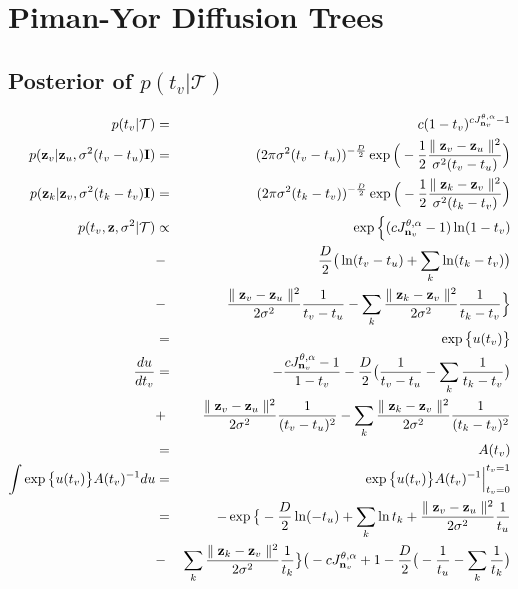 \documentclass{article}
\begin{document}
\section{Piman-Yor Diffusion Trees}
\subsection{Posterior of $p(t_v | \mathcal{T})$}	
	
	\begin{eqnarray}
	p(t_v | \mathcal{T}) &=& c(1-t_v)^{cJ^{\theta,\alpha}_{\bold{n}_v} - 1} \\
	p(\bold{z}_v | \bold{z}_u, \sigma^2(t_v - t_u)\bold{I}) &=& (2 \pi \sigma^2(t_v - t_u))^{-\frac{D}{2}} \exp \Big(-\frac{1}{2}\frac{\parallel \bold{z}_v - \bold{z}_u \parallel^2}{\sigma^2 (t_v - t_u)} \Big)\\
	p(\bold{z}_k | \bold{z}_v, \sigma^2(t_k - t_v)\bold{I}) &=& (2 \pi \sigma^2(t_k - t_v))^{-\frac{D}{2}} \exp \Big(-\frac{1}{2}\frac{\parallel \bold{z}_k - \bold{z}_v \parallel^2}{\sigma^2 (t_k - t_v)} \Big)\\
	p(t_v, \bold{z}, \sigma^2 | \mathcal{T}) & \propto & \exp \Big\{(cJ^{\theta,\alpha}_{\bold{n}_v} - 1)\ln(1 - t_v) \nonumber \\
	 &-& \frac{D}{2} \big( \ln(t_v - t_u) + \sum_k \ln(t_k - t_v) \big) \nonumber \\
	 &-& \frac{\parallel \bold{z}_v - \bold{z}_u\parallel^2}{2\sigma^2}\frac{1}{t_v - t_u} - \sum_k \frac{\parallel \bold{z}_k - \bold{z}_v\parallel^2}{2\sigma^2}\frac{1}{t_k - t_v} \Big\}  \nonumber\\
	 &=& \exp \big\{ u(t_v) \big\}\\
	\frac{du}{dt_v} &=& -\frac{cJ^{\theta,\alpha}_{\bold{n}_v} - 1}{1 - t_v} - \frac{D}{2}\big( \frac{1}{t_v - t_u} - \sum_k\frac{1}{t_k - t_v}\big) \nonumber \\
	 &+& \frac{\parallel \bold{z}_v - \bold{z}_u\parallel^2}{2\sigma^2}\frac{1}{(t_v - t_u)^2} - \sum_k \frac{\parallel \bold{z}_k - \bold{z}_v\parallel^2}{2\sigma^2}\frac{1}{(t_k - t_v)^2} \nonumber \\
	 &=& A(t_v)\\
	 \int \exp \big\{u(t_v)\big\} A(t_v)^{-1}du &=& \exp \big\{u(t_v)\big\} A(t_v)^{-1}\Big\vert^{t_v = 1}_{t_v = 0} \nonumber \\
	 &=& -\exp \big\{-\frac{D}{2}\ln(-t_u) + \sum_k\ln t_k + \frac{\parallel \bold{z}_v - \bold{z}_u\parallel^2}{2\sigma^2}\frac{1}{t_u} \nonumber \\
	 &-& \sum_k \frac{\parallel \bold{z}_k - \bold{z}_v\parallel^2}{2\sigma^2}\frac{1}{t_k} \big\} \big(-cJ^{\theta,\alpha}_{\bold{n}_v} + 1 - \frac{D}{2}\big( -\frac{1}{t_u} - \sum_k\frac{1}{t_k}\big) \nonumber \\

\end{eqnarray}
\end{document}
